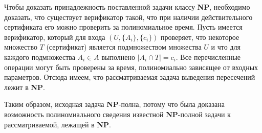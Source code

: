 \documentclass[10pt]{article}
\begin{document}
\medskip\par 
Чтобы доказать принадлежность поставленной задачи классу \textbf{NP}, необходимо доказать, что существует верификатор такой, что при наличии действительного сертификата его можно проверить за полиномиальное время. Пусть имеется верификатор, который для входа $(U, \{A_i\},\{c_i\})$ проверяет, что некоторое множество $T$ (сертификат) является подмножеством множества $U$ и что для каждого подмножества $A_i \in A$ выполнено $|A_i\cap T| = c_i$. Все перечисленные операции могут быть проверены за время, полиномиально зависящее от входных параметров. Отсюда имеем, что рассматриваемая задача выведения пересечений лежит в \textbf{NP}.
\medskip\par 
Таким образом, исходная задача \textbf{NP}-полна, потому что была доказана возможность полиномиального сведения известной \textbf{NP}-полной задачи к рассматриваемой, лежащей в \textbf{NP}. 
\ \\[0.2 cm]
\hline
\end{document}
